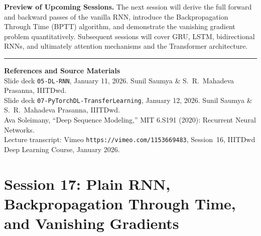 \documentclass[12pt,a4paper]{article}
\begin{document}
\vspace{1.5em}
\noindent\textbf{Preview of Upcoming Sessions.}  The next session will
derive the full forward and backward passes of the vanilla RNN, introduce the
Backpropagation Through Time (BPTT) algorithm, and demonstrate the vanishing
gradient problem quantitatively.  Subsequent sessions will cover GRU, LSTM,
bidirectional RNNs, and ultimately attention mechanisms and the Transformer
architecture.

\vspace{2em}
\noindent\rule{\linewidth}{0.4pt}
\begin{small}
\noindent\textbf{References and Source Materials}\\[3pt]
Slide deck \texttt{05-DL-RNN}, January 11, 2026.
Sunil Saumya \& S.\ R.\ Mahadeva Prasanna, IIITDwd.\\[2pt]
Slide deck \texttt{07-PyTorchDL-TransferLearning}, January 12, 2026.
Sunil Saumya \& S.\ R.\ Mahadeva Prasanna, IIITDwd.\\[2pt]
Ava Soleimany, ``Deep Sequence Modeling,'' MIT 6.S191 (2020):
Recurrent Neural Networks.\\[2pt]
Lecture transcript: Vimeo \texttt{https://vimeo.com/1153669483},
Session~16, IIITDwd Deep Learning Course, January 2026.
\end{small}

\clearpage

\part{Session 17: Plain RNN, Backpropagation Through Time, and Vanishing Gradients}

\end{document}
